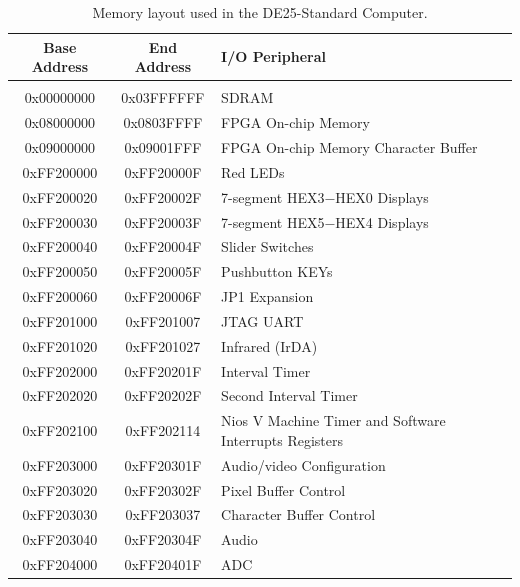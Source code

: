\documentclass[11pt, twoside, pdftex]{article}
\newcommand{\systemName}{DE25-Standard Computer}
\begin{document}
\begin{table}[h]
    \begin{center}
    \begin{tabular}{c|c|l}
            \textbf{Base Address}
            & \textbf{End Address}
            & \textbf{I/O Peripheral}
				\\\hline\vspace{-3mm}\\
            0x00000000
            & 0x03FFFFFF
            & SDRAM
        \\
            0x08000000
            & 0x0803FFFF
            & FPGA On-chip Memory
        \\
            0x09000000
            & 0x09001FFF
            & FPGA On-chip Memory Character Buffer
        \\
            0xFF200000
            & 0xFF20000F
            & Red LEDs
        \\
            0xFF200020
            & 0xFF20002F
            & 7-segment HEX3$-$HEX0 Displays
        \\
            0xFF200030
            & 0xFF20003F
            & 7-segment HEX5$-$HEX4 Displays

        \\
            0xFF200040
            & 0xFF20004F
            & Slider Switches
        \\
            0xFF200050
            & 0xFF20005F
            & Pushbutton KEYs
        \\
            0xFF200060
            & 0xFF20006F
            & JP1 Expansion
        \\
            0xFF201000
            & 0xFF201007
            & JTAG UART
        \\
            0xFF201020
            & 0xFF201027
				& Infrared (IrDA)
        \\
            0xFF202000
            & 0xFF20201F
            & Interval Timer
        \\
            0xFF202020
            & 0xFF20202F
            & Second Interval Timer
        \\
            0xFF202100
            & 0xFF202114
            & Nios V Machine Timer and Software Interrupts Registers
        \\
            0xFF203000
            & 0xFF20301F
            & Audio/video Configuration
        \\
            0xFF203020
            & 0xFF20302F
            & Pixel Buffer Control
        \\
            0xFF203030
            & 0xFF203037
            & Character Buffer Control
        \\
            0xFF203040
            & 0xFF20304F
            & Audio
        \\
            0xFF204000
            & 0xFF20401F
            & ADC
        \\
    \end{tabular}
    \caption{Memory layout used in the \systemName.}
    \label{tab:memorylayout}
    \end{center}
\end{table}
\end{document}
